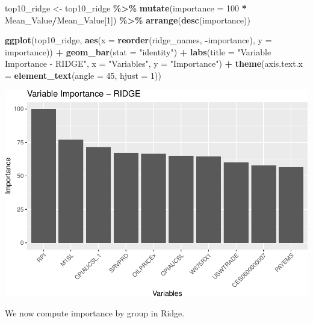 \documentclass[
]{article}
\newenvironment{Shaded}{\begin{snugshade}}{\end{snugshade}}
\newcommand{\AttributeTok}[1]{\textcolor[rgb]{0.13,0.29,0.53}{#1}}
\newcommand{\DecValTok}[1]{\textcolor[rgb]{0.00,0.00,0.81}{#1}}
\newcommand{\FunctionTok}[1]{\textcolor[rgb]{0.13,0.29,0.53}{\textbf{#1}}}
\newcommand{\NormalTok}[1]{#1}
\newcommand{\OtherTok}[1]{\textcolor[rgb]{0.56,0.35,0.01}{#1}}
\newcommand{\SpecialCharTok}[1]{\textcolor[rgb]{0.81,0.36,0.00}{\textbf{#1}}}
\newcommand{\StringTok}[1]{\textcolor[rgb]{0.31,0.60,0.02}{#1}}
\begin{document}
\begin{Shaded}
\begin{Highlighting}[]
\NormalTok{top10\_ridge }\OtherTok{\textless{}{-}}\NormalTok{ top10\_ridge }\SpecialCharTok{\%\textgreater{}\%}
    \FunctionTok{mutate}\NormalTok{(}\AttributeTok{importance =} \DecValTok{100} \SpecialCharTok{*}\NormalTok{ Mean\_Value}\SpecialCharTok{/}\NormalTok{Mean\_Value[}\DecValTok{1}\NormalTok{]) }\SpecialCharTok{\%\textgreater{}\%}
    \FunctionTok{arrange}\NormalTok{(}\FunctionTok{desc}\NormalTok{(importance))}

\FunctionTok{ggplot}\NormalTok{(top10\_ridge, }\FunctionTok{aes}\NormalTok{(}\AttributeTok{x =} \FunctionTok{reorder}\NormalTok{(ridge\_names, }\SpecialCharTok{{-}}\NormalTok{importance),}
    \AttributeTok{y =}\NormalTok{ importance)) }\SpecialCharTok{+} \FunctionTok{geom\_bar}\NormalTok{(}\AttributeTok{stat =} \StringTok{"identity"}\NormalTok{) }\SpecialCharTok{+} \FunctionTok{labs}\NormalTok{(}\AttributeTok{title =} \StringTok{"Variable Importance {-} RIDGE"}\NormalTok{,}
    \AttributeTok{x =} \StringTok{"Variables"}\NormalTok{, }\AttributeTok{y =} \StringTok{"Importance"}\NormalTok{) }\SpecialCharTok{+} \FunctionTok{theme}\NormalTok{(}\AttributeTok{axis.text.x =} \FunctionTok{element\_text}\NormalTok{(}\AttributeTok{angle =} \DecValTok{45}\NormalTok{,}
    \AttributeTok{hjust =} \DecValTok{1}\NormalTok{))}
\end{Highlighting}
\end{Shaded}

\includegraphics{Trabalho_Econo4_Q2_files/figure-latex/unnamed-chunk-29-1.pdf}

We now compute importance by group in Ridge.
\end{document}
